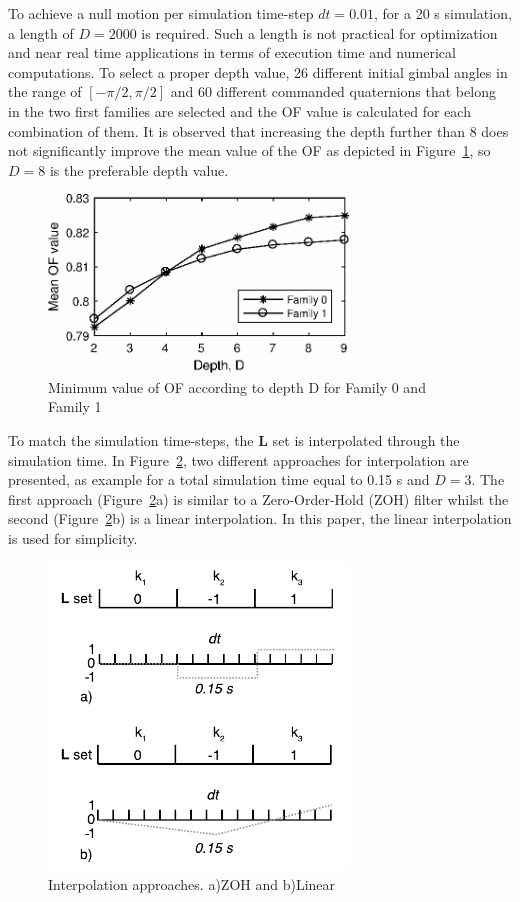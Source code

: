 \documentclass[aerospace,article,submit,moreauthors,dvi2pdf]{Definitions/mdpi}
\begin{document}
To achieve a null motion per simulation time-step $dt=0.01$, for a 20 s simulation, a length of $D=2000$ is required. Such a length is not practical for optimization and  near real time applications in terms of execution time and numerical computations. 
To select a proper depth value, 26 different initial gimbal angles in the range of $[-\pi/2 , \pi/2]$ and 60 different commanded quaternions that belong in the two first families are selected and the OF value is calculated for each combination of them.
It is observed that increasing the depth further than 8 does not significantly improve the mean value of the OF as depicted in Figure~\ref{fig:manip_to_depth}, so $D=8$ is the preferable depth value. 
\begin{figure}[H]
\includegraphics[width=8cm]{chara1.eps}
\caption{\label{fig:manip_to_depth}Minimum value of OF according to depth D for Family 0 and Family 1}
\end{figure}
To match the simulation time-steps, the $\textbf{L}$ set is interpolated through the simulation time. In Figure~\ref{fig:interp}, two different approaches for interpolation are presented, as example for a total simulation time equal to 0.15 s and $D=3$. The first approach (Figure~\ref{fig:interp}a) is similar to a Zero-Order-Hold (ZOH) filter whilst the second (Figure~\ref{fig:interp}b) is a linear interpolation.  In this paper, the linear interpolation is used for simplicity.
\begin{figure}[H]
\includegraphics[width=8cm]{chara2.pdf}
\caption{\label{fig:interp}Interpolation approaches. a)ZOH and b)Linear}
\end{figure}
\end{document}
